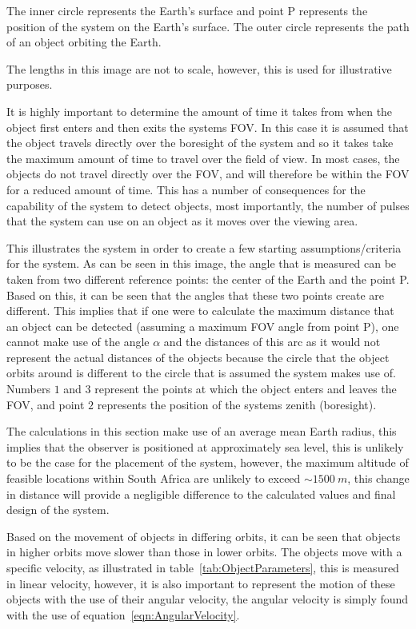 \documentclass[11pt]{witseiepaper}
\begin{document}
\begin{bibunit}[witseie]
The inner circle represents the Earth's surface and point P represents the position of the system on the Earth's surface.  
The outer circle represents the path of an object orbiting the Earth.

The lengths in this image are not to scale, however, this is used for illustrative purposes.

It is highly important to determine the amount of time it takes from when the object first enters and then exits the systems FOV.
In this case it is assumed that the object travels directly over the boresight of the system and so it takes take the maximum amount of time to travel over the field of view. In most cases, the objects do not travel directly over the FOV, and will therefore be within the FOV for a reduced amount of time. This has a number of consequences for the capability of the system to detect objects, most importantly, the number of pulses that the system can use on an object as it moves over the viewing area.

This illustrates the system in order to create a few starting assumptions/criteria for the system.
As can be seen in this image, the angle that is measured can be taken from two different reference points: the center of the Earth and the point P. Based on this, it can be seen that the angles that these two points create are different. This implies that if one were to calculate the maximum distance that an object can be detected (assuming a maximum FOV angle from point P), one cannot make use of the angle $\alpha$ and the distances of this arc as it would not represent the actual distances of the objects because the circle that the object orbits around is different to the circle that is assumed the system makes use of.
Numbers $1$ and $3$ represent the points at which the object enters and leaves the FOV, and point $2$ represents the position of the systems zenith (boresight).


The calculations in this section make use of an average mean Earth radius, this implies that the observer is positioned at approximately sea level, this is unlikely to be the case for the placement of the system, however, the maximum altitude of feasible locations within South Africa are unlikely to exceed $\sim 1500~m$, this change in distance will provide a negligible difference to the calculated values and final design of the system.


Based on the movement of objects in differing orbits, it can be seen that objects in higher orbits move slower than those in lower orbits.
The objects move with a specific velocity, as illustrated in table~\ref{tab:ObjectParameters}, this is measured in linear velocity, however, it is also important to represent the motion of these objects with the use of their angular velocity, the angular velocity is simply found with the use of equation~\ref{eqn:AngularVelocity}.


\end{bibunit}
\end{document}
